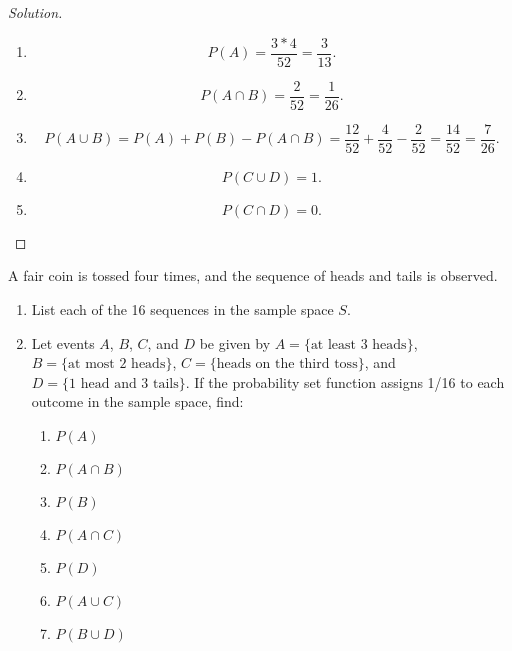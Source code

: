 \documentclass[class=probandstats,crop=false]{standalone}
\begin{document}
\begin{proof}[Solution]
    \begin{enumerate}[label = \textbf{(\alph*)}]
        \item
              \[
                  P(A) = \dfrac{3 * 4}{52} = \dfrac{3}{13}.
              \]
        \item
              \[
                  P(A\cap B) = \dfrac{2}{52} = \dfrac{1}{26}.
              \]
        \item
              \[
                  P(A\cup B) = P(A) + P(B) - P(A\cap B) = \dfrac{12}{52} + \dfrac{4}{52} - \dfrac{2}{52} = \dfrac{14}{52} = \dfrac{7}{26}.
              \]
        \item
              \[
                  P(C\cup D) = 1.
              \]
        \item
              \[
                  P(C\cap D) = 0.
              \]
    \end{enumerate}
\end{proof}

\begin{exercise}
    \par A fair coin is tossed four times, and the sequence of heads and tails is observed.
    \begin{enumerate}[label = \textbf{(\alph*)}]
        \item List each of the 16 sequences in the sample space $S$.
        \item Let events $A$, $B$, $C$, and $D$ be given by $A = \{ \text{at least
                      3 heads} \}$, $B = \{\text{at most 2 heads}\}$, $C = \{\text{heads on the third toss}\}$, and $D = \{\text{1 head and 3 tails}\}$. If the probability set function assigns 1/16 to each outcome in the sample space, find:
              \begin{enumerate}[label = \textbf{(\arabic*)}]
                  \item $P(A)$
                  \item $P(A\cap B)$
                  \item $P(B)$
                  \item $P(A\cap C)$
                  \item $P(D)$
                  \item $P(A\cup C)$
                  \item $P(B\cup D)$
              \end{enumerate}
    \end{enumerate}
\end{exercise}
\end{document}
